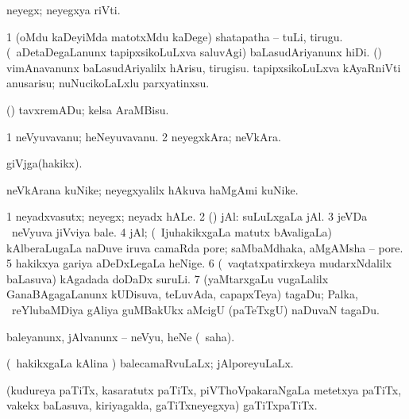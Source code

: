{\bentry
{} 
\gl{\nA}
\expl{}
\bmng
neyegx; neyegxya riVti. 
\emng
\eentry

\bentry
{} 
\gl{\akirx}
\expl{}
\bmng
\bnum
\num{1} (oMdu kaDeyiMda matotxMdu kaDege) shatapatha -- tuLi, tirugu. 
 (\kanmu\ aDetaDegaLanunx tapipxsikoLuLxva saluvAgi) baLasudAriyanunx hiDi. (\AmA) 
\banum
{} vimAnavanunx baLasudAriyalilx hArisu, tirugisu. 
 tapipxsikoLuLxva kAyaRniVti anusarisu; nuNucikoLaLxlu parxyatinxsu. 
\eanum
\numie
\enum
\emng

\noindent 
\gl{\pagu}
\expl{}
\bmng
{} (\ashi) tavxremADu; kelsa AraMBisu. 
\emng
\eentry

\bentry
{} 
\gl{\nA}
\expl{}
\bmng
\bnum
\num{1} neVyuvavanu; heNeyuvavanu. 
\num{2} neyegxkAra; neVkAra. 
\enum
\emng
\eentry

\bentry
{} 
\gl{\nA}
\expl{}
\bmng
giVjga(hakikx). 
\emng
\eentry

\bentry
{} 
\gl{\nA}
\expl{}
\bmng
neVkArana kuNike; neyegxyalilx hAkuva haMgAmi kuNike. 
\emng
\eentry

\bentry
{} 
\gl{\nA}
\expl{}
\bmng
\bnum
\num{1} neyadxvasutx; neyegx; neyadx hALe. 
\num{2} (\rUpa) jAl:  suLuLxgaLa jAl. 
\num{3} jeVDa \mo\ neVyuva jiVviya bale. 
\num{4} jAl; (\kanmu\ IjuhakikxgaLa matutx bAvaligaLa) kAlberaLugaLa naDuve iruva camaRda pore; saMbaMdhaka, aMgAMsha -- pore. 
\num{5} hakikxya gariya aDeDxLegaLa heNige. 
\num{6} (\kanmu\ vaqtatxpatirxkeya mudarxNdalilx baLasuva) kAgadada doDaDx suruLi. 
\num{7} (yaMtarxgaLu \mo vugaLalilx GanaBAgagaLanunx kUDisuva, teLuvAda, capapxTeya) tagaDu; Palka, \udA\ reYlubaMDiya gAliya guMBakUkx aMcigU (paTeTxgU) naDuvaN tagaDu. 
\enum
\emng

\noindent 
\gl{\pagu}
\expl{}
\bmng
{} 
\emng
\eentry

\bentry
{} 
\gl{\sakirx}
\bmng
baleyanunx, jAlvanunx -- neVyu, heNe (\akirx\ saha). 
\emng
\eentry

\bentry
{} 
\gl{\gu}
\expl{}
\bmng
(\kanmu\ hakikxgaLa kAlina \vi) balecamaRvuLaLx; jAlporeyuLaLx. 
\emng
\eentry

\bentry
{} 
\gl{\nA}
\expl{}
\bmng
(kudureya paTiTx, kasaratutx paTiTx, piVThoVpakaraNgaLa metetxya paTiTx, \mo vakekx baLasuva, kiriyagalda, gaTiTxneyegxya) gaTiTxpaTiTx. 
\emng
\eentry

}
